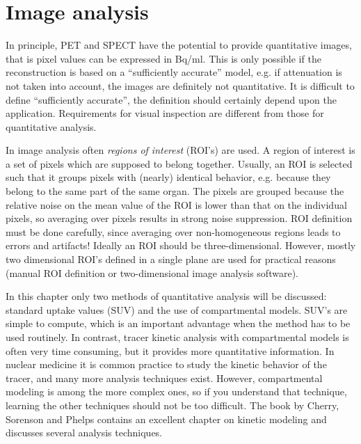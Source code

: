\chapter{Image analysis}


In principle, PET and SPECT have the potential to provide quantitative images,
that is pixel values can be expressed in Bq/ml. This is only possible if the
reconstruction is based on a ``sufficiently accurate'' model, e.g. if
attenuation is not taken into account, the images are definitely not
quantitative. It is difficult to define ``sufficiently accurate'', the
definition should certainly depend upon the application. Requirements for
visual inspection are different from those for quantitative analysis.

In image analysis often {\em regions of interest} (ROI's) are used. A region
of interest is a set of pixels which are supposed to belong together. Usually,
an ROI is selected such that it groups pixels with (nearly) identical
behavior, e.g. because they belong to the same part of the same organ. The
pixels are grouped because the relative noise on the mean value of the ROI is
lower than that on the individual pixels, so averaging over pixels results in
strong noise suppression. ROI definition must be done carefully, since
averaging over non-homogeneous regions leads to errors and artifacts! Ideally
an ROI should be three-dimensional. However, mostly two dimensional ROI's
defined in a single plane are used for practical reasons (manual ROI
definition or two-dimensional image analysis software).

In this chapter only two methods of quantitative analysis will be
discussed: standard uptake values (SUV) and the use of compartmental
models. SUV's are simple to compute, which is an important advantage
when the method has to be used routinely. In contrast, tracer kinetic
analysis with compartmental models is often very time consuming, but
it provides more quantitative information.  In nuclear medicine it is
common practice to study the kinetic behavior of the tracer, and many
more analysis techniques exist. However, compartmental modeling is
among the more complex ones, so if you understand that technique,
learning the other techniques should not be too difficult.  The book
by Cherry, Sorenson and Phelps \cite{Cherry} contains an excellent
chapter on kinetic modeling and discusses several analysis techniques.


